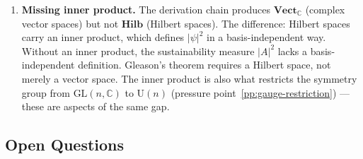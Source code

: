 \documentclass[12pt,a4paper]{article}
\begin{document}
\begin{enumerate}
  \item \label{pp:inner-product} \textbf{Missing inner product.} The derivation chain produces $\mathbf{Vect}_{\mathbb{C}}$ (complex vector spaces) but not $\mathbf{Hilb}$ (Hilbert spaces). The difference: Hilbert spaces carry an inner product, which defines $|\psi|^2$ in a basis-independent way. Without an inner product, the sustainability measure $|A|^2$ lacks a basis-independent definition. Gleason's theorem requires a Hilbert space, not merely a vector space. The inner product is also what restricts the symmetry group from $\text{GL}(n, \mathbb{C})$ to $\text{U}(n)$ (pressure point~\ref{pp:gauge-restriction}) --- these are aspects of the same gap.
\end{enumerate}

\subsection{Open Questions}
\label{sec:open-questions}
\end{document}

